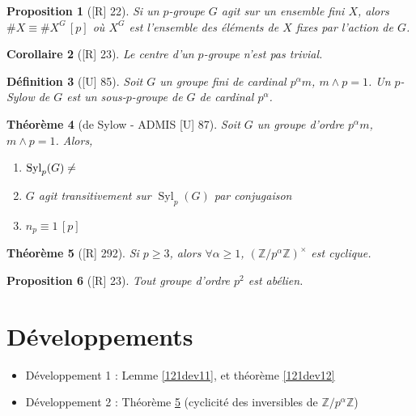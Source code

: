 \documentclass[10pt, a4paper, parskip=full, twoside, twocolumn]{report}
\newtheorem{definition}{Définition}
\newtheorem{theorem}[definition]{Théorème}
\newtheorem{proposition}[definition]{Proposition}
\newtheorem{corollary}[definition]{Corollaire}
\newcommand{\IZ}{\mathbb{Z}}
\DeclareMathOperator{\Syl}{Syl}
\begin{document}
\begin{proposition}[\textnormal{[R] 22}]
	Si un $p$-groupe $G$ agit sur un ensemble fini $X$, alors $\# X \equiv \#X^G\,[p]$
	où $X^G$ est l'ensemble des éléments de $X$ fixes par l'action de $G$.
\end{proposition}

\begin{corollary}[\textnormal{[R] 23}]
	Le centre d'un $p$-groupe n'est pas trivial.
\end{corollary}

\begin{definition}[\textnormal{[U] 85}]
	Soit $G$ un groupe fini de cardinal $p^{\alpha}m$, $m\wedge p=1$. Un $p$-Sylow de $G$
	est un sous-$p$-groupe de $G$ de cardinal $p^{\alpha}$.
\end{definition}

\begin{theorem}[de Sylow - ADMIS \textnormal{[U] 87}]Soit $G$ un groupe d'ordre $p^{\alpha}m$, $m\wedge p = 1$. Alors,
	\begin{enumerate}
		\item $\Syl_p(G)\neq \empty$
		\item $G$ agit transitivement sur $\Syl_p(G)$ par conjugaison
		\item $n_p\equiv 1\, [p]$
	\end{enumerate}
\end{theorem}

\begin{tcolorbox}[
    breakable, %
    colback=developpement, %
    colframe=gray!0!black, %
    boxrule=0pt, %
    arc=1mm, %
	boxsep=0pt,
	left=0pt, right=0pt, top=0pt, bottom=0pt
]
\begin{theorem}[\textnormal{[R] 292}]
	\label{121dev2}
	Si $p\geq 3$, alors $\forall \alpha \geq 1$, $\left(\IZ/p^{\alpha}\IZ\right)^{\times}$ est cyclique.
\end{theorem}
\end{tcolorbox}

\begin{proposition}[\textnormal{[R] 23}]
	Tout groupe d'ordre $p^2$ est abélien.
\end{proposition}

\section*{Développements}
\begin{itemize}
	\item Développement 1 : Lemme \ref{121dev11}, et théorème \ref{121dev12}
	\item Développement 2 : Théorème \ref{121dev2} (cyclicité des inversibles de $\IZ/p^{\alpha}\IZ$)
\end{itemize}
\end{document}

